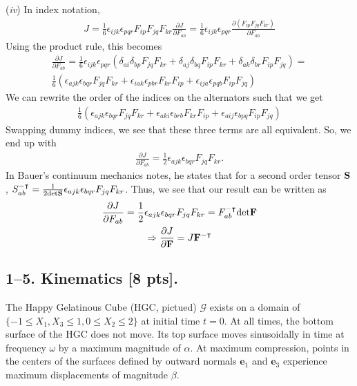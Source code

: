 (\textit{iv})
In index notation,
\begin{gather*}
    J = \frac{1}{6}\epsilon_{ijk}\epsilon_{pqr}F_{ip}F_{jq}F_{kr}
    \frac{\partial J}{\partial F_{ab}}=\frac{1}{6}\epsilon_{ijk}\epsilon_{pqr}\frac{\partial(F_{ip}F_{jq}F_{kr})}{\partial F_{ab}}
\end{gather*}
Using the product rule, this becomes
\begin{gather*}
    \frac{\partial J}{\partial F_{ab}}=\frac{1}{6}\epsilon_{ijk}\epsilon_{pqr}(\delta_{ai}\delta_{bp}F_{jq}F_{kr} + \delta_{aj}\delta_{bq}F_{ip}F_{kr} + \delta_{ak}\delta_{br}F_{ip}F_{jq})=\\
    \frac{1}{6}(\epsilon_{ajk}\epsilon_{bqr}F_{jq}F_{kr}+\epsilon_{iak}\epsilon_{pbr}F_{kr}F_{ip}+\epsilon_{ija}\epsilon_{pqb}F_{ip}F_{jq})
\end{gather*}
We can rewrite the order of the indices on the alternators such that we get
\begin{gather*}
    \frac{1}{6}(\epsilon_{ajk}\epsilon_{bqr}F_{jq}F_{kr}+\epsilon_{aki}\epsilon_{brb}F_{kr}F_{ip}+\epsilon_{aij}\epsilon_{bpq}F_{ip}F_{jq})
\end{gather*}
Swapping dummy indices, we see that these three terms are all equivalent. So, we end up with
\begin{gather*}
    \frac{\partial J}{\partial F_{ab}}=\frac{1}{2}\epsilon_{ajk}\epsilon_{bqr}F_{jq}F_{kr}.
\end{gather*}
In Bauer's continuum mechanics notes, he states that for a second order tensor $\mathbf{S}$, $S^{-\intercal}_{ab}=\frac{1}{2\text{det}\mathbf{S}}\epsilon_{ajk}\epsilon_{bqr}F_{jq}F_{kr}$. Thus, we see that our result can be written as
\begin{gather*}
    \frac{\partial J}{\partial F_{ab}}=\frac{1}{2}\epsilon_{ajk}\epsilon_{bqr}F_{jq}F_{kr}= F^{-\intercal}_{ab}\text{det}\mathbf{F}\\
    \Rightarrow \frac{\partial J}{\partial \mathbf{F}}=J\mathbf{F}^{-\intercal}
\end{gather*}

\bigskip
\subsection*{1--5. \textbf{Kinematics} [8 pts].} The Happy Gelatinous Cube (HGC, pictued) $\mathcal{G}$ exists on a domain of $\{-1\leq X_1 , X_3\leq1, 0\leq X_2 \leq 2\}$ at initial time $t=0$. 
At all times, the bottom surface of the HGC does not move. 
Its top surface moves sinusoidally in time at frequency $\omega$ by a maximum magnitude of $\alpha$. 
At maximum compression, points in the centers of the surfaces defined by outward normals $\bm{e}_1$ and $\bm{e}_3$ experience maximum displacements of magnitude $\beta$. 

